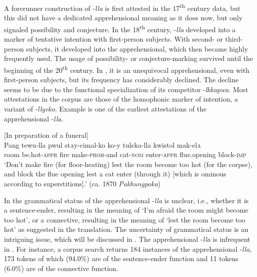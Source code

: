 \documentclass[output=paper,colorlinks,citecolor=brown]{langscibook}
\begin{document}
A forerunner construction of \nobreakdash-\textit{lla} is first attested in the 17\textsuperscript{th} century data, but this did not have a dedicated apprehensional meaning as it does now, but only signaled possibility and conjecture. In the 18\textsuperscript{th} century, \nobreakdash-\textit{lla} developed into a marker of tentative intention with first-person subjects. With second- or third-person subjects, it developed into the apprehensional, which then became highly frequently used. The usage of possibility- or conjecture-marking survived until the beginning of the 20\textsuperscript{th} century. In , it is an unequivocal apprehensional, even with first-person subjects, but its frequency has considerably declined. The decline seems to be due to the functional specialization of its competitor \nobreakdash-\textit{lkkapwa}. Most attestations in the corpus are those of the homophonic marker of intention, a variant of \nobreakdash-\textit{llyeko}. Example  is one of the earliest attestations of the apprehensional \nobreakdash-\textit{lla}.


\ea \label{ex:RK10} \textnormal{$[$In preparation of a funeral$]$} \\
\gll Pang tewu-lla pwul st\textsc{a}y-cimal-ko ko-y tuleka-lla kwistol mak-el\textsc{a} \\
room be.hot-\textsc{appr} fire make-\textsc{proh}-and cat-\textsc{nom} enter-\textsc{appr} flue.opening block-\textsc{imp} \\
\glt `Don't make fire (for floor-heating) lest the room become too hot (for the corpse), and block the flue opening lest a cat enter (through it) [which is ominous according to superstitions].' (ca. 1870 \textit{Pakhungpoka})
\z

\noindent In  the grammatical status of the apprehensional \nobreakdash-\textit{lla} is unclear, i.e., whether it is a sentence-ender, resulting in the meaning of `I'm afraid the room might become too hot', or a connective, resulting in the meaning of `lest the room become too hot' as suggested in the translation. The uncertainty of grammatical status is an intriguing issue, which will be discussed in . The apprehensional \nobreakdash-\textit{lla} is infrequent in . For instance, a corpus search returns 184 instances of the apprehensional \nobreakdash-\textit{lla}, 173 tokens of which (94.0\%) are of the sentence-ender function and 11 tokens (6.0\%) are of the connective function. 
\end{document}

